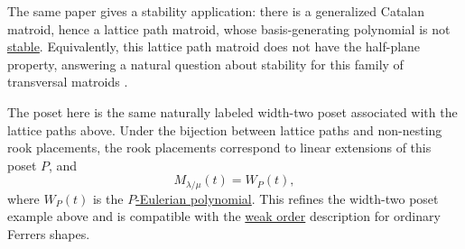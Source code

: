 The same paper gives a stability application: there is a generalized Catalan
matroid, hence a lattice path matroid, whose basis-generating polynomial is not
\hyperref[stablePolynomial]{stable}. Equivalently, this lattice path matroid
does not have the half-plane property, answering a natural question about
stability for this family of transversal matroids
\cite{ChoeOxleySokalWagner2004,ChoeWagner2006}.

The poset here is the same naturally labeled width-two poset associated with
the lattice paths above. Under the bijection between lattice paths and
non-nesting rook placements, the rook placements correspond to linear
extensions of this poset $P$, and
\[
  M_{\lambda/\mu}(t) = W_P(t),
\]
where $W_P(t)$ is the
\hyperref[pEulerianPolynomial]{$P$-Eulerian polynomial}. This refines the
width-two poset example above and is compatible with the
\hyperref[weakOrder]{weak order} description for ordinary Ferrers shapes.
